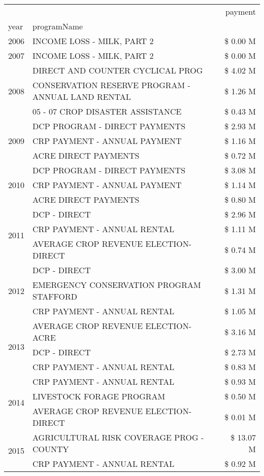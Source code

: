 \begin{tabular}{llr}
\toprule
 &  & payment \\
year & programName &  \\
\midrule
2006 & INCOME LOSS - MILK, PART 2 & \$ 0.00 M \\
\cline{1-3}
2007 & INCOME LOSS - MILK, PART 2 & \$ 0.00 M \\
\cline{1-3}
\multirow[t]{3}{*}{2008} & DIRECT AND COUNTER CYCLICAL PROG & \$ 4.02 M \\
 & CONSERVATION RESERVE PROGRAM - ANNUAL LAND RENTAL & \$ 1.26 M \\
 & 05 - 07 CROP DISASTER ASSISTANCE & \$ 0.43 M \\
\cline{1-3}
\multirow[t]{3}{*}{2009} & DCP PROGRAM - DIRECT PAYMENTS & \$ 2.93 M \\
 & CRP PAYMENT - ANNUAL PAYMENT & \$ 1.16 M \\
 & ACRE DIRECT PAYMENTS & \$ 0.72 M \\
\cline{1-3}
\multirow[t]{3}{*}{2010} & DCP PROGRAM - DIRECT PAYMENTS & \$ 3.08 M \\
 & CRP PAYMENT - ANNUAL PAYMENT & \$ 1.14 M \\
 & ACRE DIRECT PAYMENTS & \$ 0.80 M \\
\cline{1-3}
\multirow[t]{3}{*}{2011} & DCP - DIRECT & \$ 2.96 M \\
 & CRP PAYMENT - ANNUAL RENTAL & \$ 1.11 M \\
 & AVERAGE CROP REVENUE ELECTION-DIRECT & \$ 0.74 M \\
\cline{1-3}
\multirow[t]{3}{*}{2012} & DCP - DIRECT & \$ 3.00 M \\
 & EMERGENCY CONSERVATION PROGRAM STAFFORD & \$ 1.31 M \\
 & CRP PAYMENT - ANNUAL RENTAL & \$ 1.05 M \\
\cline{1-3}
\multirow[t]{3}{*}{2013} & AVERAGE CROP REVENUE ELECTION-ACRE & \$ 3.16 M \\
 & DCP - DIRECT & \$ 2.73 M \\
 & CRP PAYMENT - ANNUAL RENTAL & \$ 0.83 M \\
\cline{1-3}
\multirow[t]{3}{*}{2014} & CRP PAYMENT - ANNUAL RENTAL & \$ 0.93 M \\
 & LIVESTOCK FORAGE PROGRAM & \$ 0.50 M \\
 & AVERAGE CROP REVENUE ELECTION-DIRECT & \$ 0.01 M \\
\cline{1-3}
\multirow[t]{3}{*}{2015} & AGRICULTURAL RISK COVERAGE PROG - COUNTY & \$ 13.07 M \\
 & CRP PAYMENT - ANNUAL RENTAL & \$ 0.92 M \\

\end{tabular}
